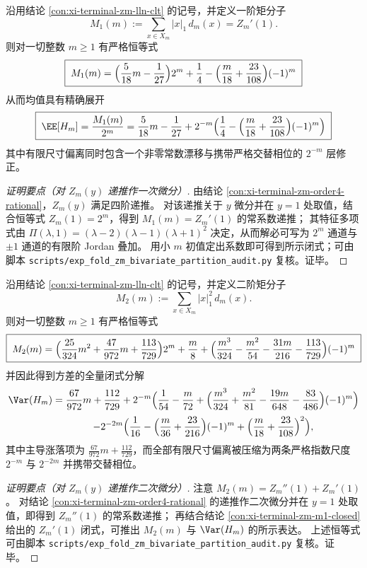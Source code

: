 \begin{conclusion}\label{con:xi-terminal-zm-m1-closed}
沿用结论 \ref{con:xi-terminal-zm-lln-clt} 的记号，并定义一阶矩分子
\[
M_1(m):=\sum_{x\in X_m}|x|_1\,d_m(x)=Z_m'(1).
\]
则对一切整数 \(m\ge 1\) 有严格恒等式
\[
\boxed{\;
M_1(m)=\Bigl(\frac{5}{18}m-\frac{1}{27}\Bigr)2^m+\frac14-\Bigl(\frac{m}{18}+\frac{23}{108}\Bigr)(-1)^m\;}
\]
从而均值具有精确展开
\[
\boxed{\;
\EE[H_m]=\frac{M_1(m)}{2^m}
=\frac{5}{18}m-\frac{1}{27}
+2^{-m}\Bigl(\frac14-\Bigl(\frac{m}{18}+\frac{23}{108}\Bigr)(-1)^m\Bigr)\;}
\]
其中有限尺寸偏离同时包含一个非零常数漂移与携带严格交替相位的 \(2^{-m}\) 层修正。
\end{conclusion}
\begin{proof}[证明要点（对 \(Z_m(y)\) 递推作一次微分）]
由结论 \ref{con:xi-terminal-zm-order4-rational}，\(Z_m(y)\) 满足四阶递推。
对该递推关于 \(y\) 微分并在 \(y=1\) 处取值，结合恒等式 \(Z_m(1)=2^m\)，得到 \(M_1(m)=Z_m'(1)\) 的常系数递推；
其特征多项式由 \(\Pi(\lambda,1)=(\lambda-2)(\lambda-1)(\lambda+1)^2\) 决定，从而解必可写为 \(2^m\) 通道与 \(\pm 1\) 通道的有限阶 Jordan 叠加。
用小 \(m\) 初值定出系数即可得到所示闭式；可由脚本 \texttt{scripts/exp\_fold\_zm\_bivariate\_partition\_audit.py} 复核。证毕。
\end{proof}

\begin{conclusion}\label{con:xi-terminal-zm-m2-var-closed}
沿用结论 \ref{con:xi-terminal-zm-lln-clt} 的记号，并定义二阶矩分子
\[
M_2(m):=\sum_{x\in X_m}|x|_1^2\,d_m(x).
\]
则对一切整数 \(m\ge 1\) 有严格恒等式
\[
\boxed{\;
M_2(m)=\Bigl(\frac{25}{324}m^2+\frac{47}{972}m+\frac{113}{729}\Bigr)2^m+\frac{m}{8}
+\Bigl(\frac{m^3}{324}-\frac{m^2}{54}-\frac{31m}{216}-\frac{113}{729}\Bigr)(-1)^m\;}
\]
并因此得到方差的全量闭式分解
\[
\Var(H_m)=\frac{67}{972}m+\frac{112}{729}
+2^{-m}\Bigl(\frac{1}{54}-\frac{m}{72}+\Bigl(\frac{m^3}{324}+\frac{m^2}{81}-\frac{19m}{648}-\frac{83}{486}\Bigr)(-1)^m\Bigr)
\]
\[
\qquad\qquad
-2^{-2m}\Bigl(\frac{1}{16}-\Bigl(\frac{m}{36}+\frac{23}{216}\Bigr)(-1)^m+\Bigl(\frac{m}{18}+\frac{23}{108}\Bigr)^2\Bigr),
\]
其中主导涨落项为 \(\frac{67}{972}m+\frac{112}{729}\)，而全部有限尺寸偏离被压缩为两条严格指数尺度 \(2^{-m}\) 与 \(2^{-2m}\) 并携带交替相位。
\end{conclusion}
\begin{proof}[证明要点（对 \(Z_m(y)\) 递推作二次微分）]
注意 \(M_2(m)=Z_m''(1)+Z_m'(1)\)。
对结论 \ref{con:xi-terminal-zm-order4-rational} 的递推作二次微分并在 \(y=1\) 处取值，即得到 \(Z_m''(1)\) 的常系数递推；
再结合结论 \ref{con:xi-terminal-zm-m1-closed} 给出的 \(Z_m'(1)\) 闭式，可推出 \(M_2(m)\) 与 \(\Var(H_m)\) 的所示表达。
上述恒等式可由脚本 \texttt{scripts/exp\_fold\_zm\_bivariate\_partition\_audit.py} 复核。证毕。
\end{proof}

